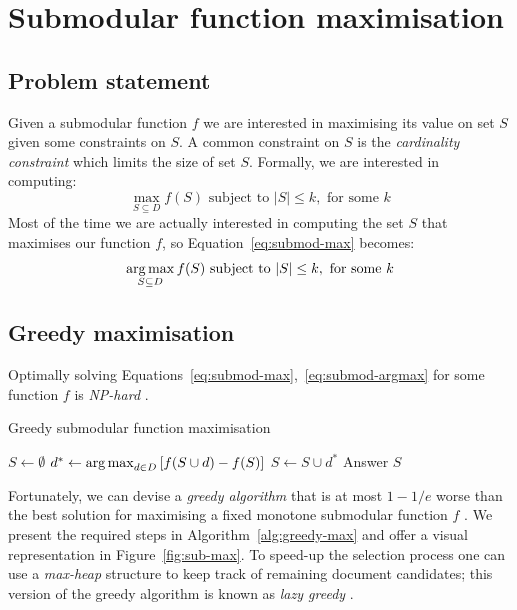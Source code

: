 \section{Submodular function maximisation}
\label{sec:submod-max}

\subsection{Problem statement}

Given a submodular function \(f\) we are interested in maximising its value on
set \(S\) given some constraints on \(S\). A common constraint on \(S\) is the
\emph{cardinality constraint} which limits the size of set \(S\). Formally,
we are interested in computing:
\begin{equation}
  \label{eq:submod-max}
  \max_{S \subseteq D} f(S) \text{ subject to } |S| \leq k, \text{ for some } k
\end{equation}
Most of the time we are actually interested in computing the set \(S\) that
maximises our function \(f\), so Equation~\ref{eq:submod-max} becomes:
\begin{equation}
  \label{eq:submod-argmax}
  \operatorname*{arg\,max}_{S \subseteq D} f(S) \text{ subject to } |S| \leq k, \text{ for some
  } k
\end{equation}

\subsection{Greedy maximisation}
Optimally solving Equations~\ref{eq:submod-max},~\ref{eq:submod-argmax} for
some function \(f\) is \emph{NP-hard} \cite{krause2012submodular}.
\begin{algorithm}
  \caption{Greedy submodular function maximisation}
  \label{alg:greedy-max}
  \begin{algorithmic}
    \STATE \(S \gets \emptyset\)
      \STATE \(d^* \gets \operatorname*{arg\,max}_{d \in D} \left[ f(S \cup {d}) - f(S)
          \right]\)
      \STATE \(S \gets S \cup {d^*}\)
    \ENDWHILE
    \STATE Answer \(S\)
  \end{algorithmic}
\end{algorithm}
Fortunately, we can devise a \emph{greedy algorithm} that is at most \(1 - 1 /
e\) worse than the best solution for maximising a fixed monotone submodular
function \(f\) \cite{nemhauser1978analysis}.
We present the required steps in Algorithm~\ref{alg:greedy-max} and offer a
visual representation in Figure~\ref{fig:sub-max}.
To speed-up the selection process one can use a \emph{max-heap} structure to
keep track of remaining document candidates; this version of the greedy
algorithm is known as \emph{lazy greedy} \cite{minoux1978accelerated}.

